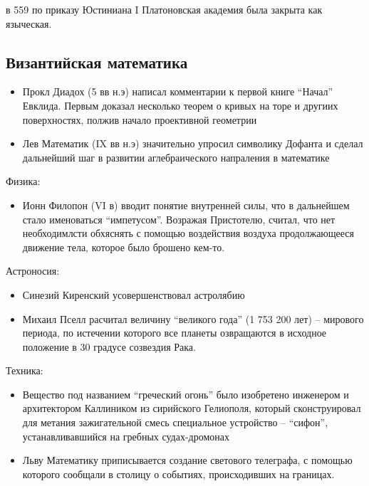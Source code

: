 \documentclass{book}
\theoremstyle{definition}
\begin{document}
    в 559 по приказу Юстиниана I Платоновская академия была закрыта как языческая.

    \subsection{Византийская математика}

    \begin{itemize}
        \item Прокл Диадох (5 вв н.э) написал комментарии к первой книге ``Начал'' Евклида. Первым доказал несколько теорем о кривых на торе и другиих поверхностях, полжив начало проективной геометрии
        \item Лев Математик (IX вв н.э) значительно упросил символику Дофанта и сделал дальнейший шаг в развитии аглебраического напраления  в математике
    \end{itemize}

    Физика:
    \begin{itemize}
        \item Ионн Филопон (VI в) вводит понятие внутренней силы, что в дальнейшем стало именоваться ``импетусом''. Возражая Пристотелю, считал, что нет необходимлсти обхяснять с помощью воздействия воздуха продолжающееся движение тела, которое было брошено кем-то.
    \end{itemize}


    Астроносия:
    \begin{itemize}
        \item Синезий Киренский усовершенствовал астролябию
        \item Михаил Пселл расчитал величину ``великого года'' (1 753 200 лет) -- мирового периода, по истечении которого все планеты озвращаются в исходное положение в 30 градусе созвездия Рака.
    \end{itemize}

    Техника:
    \begin{itemize}
        \item Вещество под названием ``греческий огонь'' было изобретено инженером и архитектором Каллиником из сирийского Гелиополя, который сконструировал для метания зажигательной смесь специальное устройство -- ``сифон'', устанавливавшийся на гребных судах-дромонах
        \item Льву Математику приписывается создание светового телеграфа, с помощью которого сообщали в столицу о событиях, происходивших на границах.
    \end{itemize}
\end{document}
